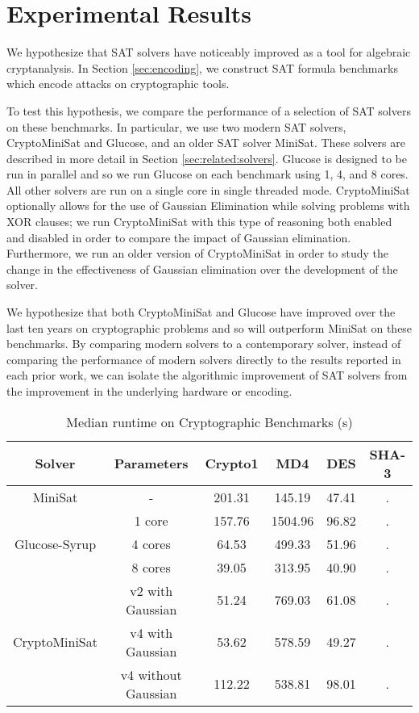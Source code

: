 \section{Experimental Results}
\label{sec:results}

We hypothesize that SAT solvers have noticeably improved as a tool for algebraic cryptanalysis. In Section \ref{sec:encoding}, we construct SAT formula benchmarks which encode attacks on cryptographic tools. 

To test this hypothesis, we compare the performance of a selection of SAT solvers on these benchmarks. In particular, we use two modern SAT solvers, CryptoMiniSat and Glucose, and an older SAT solver MiniSat. These solvers are described in more detail in Section \ref{sec:related:solvers}. Glucose is designed to be run in parallel and so we run Glucose on each benchmark using 1, 4, and 8 cores. All other solvers are run on a single core in single threaded mode. CryptoMiniSat optionally allows for the use of Gaussian Elimination while solving problems with XOR clauses; we run CryptoMiniSat with this type of reasoning both enabled and disabled in order to compare the impact of Gaussian elimination. Furthermore, we run an older version of CryptoMiniSat in order to study the change in the effectiveness of Gaussian elimination over the development of the solver.

We hypothesize that both CryptoMiniSat and Glucose have improved over the last ten years on cryptographic problems and so will outperform MiniSat on these benchmarks. By comparing modern solvers to a contemporary solver, instead of comparing the performance of modern solvers directly to the results reported in each prior work, we can isolate the algorithmic improvement of SAT solvers from the improvement in the underlying hardware or encoding.

\begin{table}[!htbp]
	\centering
	\begin{tabular}{|c|c|c|c|c|c|}
		\hline
		\textbf{Solver} & \textbf{Parameters} & \textbf{Crypto1} & \textbf{MD4} & \textbf{DES} & \textbf{SHA-3} \\
		\hline
		MiniSat & - & 201.31 & 145.19 & 47.41 & .\\
		\hline
		\multirow{3}{*}{Glucose-Syrup} & 1 core & 157.76 & 1504.96 & 96.82 & .\\ \cline{2-6}
		& 4 cores & 64.53 & 499.33 & 51.96 & .\\ \cline{2-6}
		& 8 cores & 39.05 & 313.95 & 40.90 & .\\
		\hline
		
		\multirow{3}{*}{CryptoMiniSat} & v2 with Gaussian & 51.24 & 769.03 & 61.08 & . \\ \cline{2-6}
		& v4 with Gaussian & 53.62 & 578.59 & 49.27 & . \\ \cline{2-6}
		& v4 without Gaussian & 112.22 & 538.81 & 98.01 & .\\
		\hline
	\end{tabular}
	
	\caption{Median runtime on Cryptographic Benchmarks (s)}
	\label{table:all:runtime}
\end{table}


